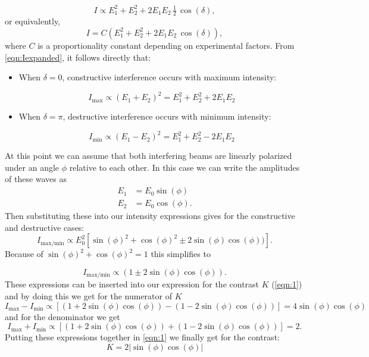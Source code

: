 $$
I \propto E_1^2 + E_2^2 + 2E_1E_2\,\tfrac12\,\cos(\delta),
$$
or equivalently,
\begin{equation}
I = C(E_1^2+E_2^2+ 2E_1E_2\,\cos({\delta})),
    \label{eqn:Iexpanded}
\end{equation}
where $C$ is a proportionality constant depending on experimental factors.
\noindent
From \autoref{eqn:Iexpanded}, it follows directly that:
\begin{itemize}
\item When $\delta = 0$, constructive interference occurs with maximum intensity:
  
$$
I_\text{max}\propto (E_1+E_2)^2 = E_1^2+E_2^2+ 2E_1E_2
$$

\item When $\delta = \pi$, destructive interference occurs with minimum intensity:
  
$$
I_\text{min}\propto (E_1-E_2)^2 = E_1^2+E_2^2 - 2E_1E_2
$$
\end{itemize}
\noindent
At this point we can assume that both interfering beams are linearly polarized under an angle $\phi$ relative to each other. In this case we can write the amplitudes of these waves as
\begin{align*}
    E_1&=E_0 \sin(\phi) \\
    E_2&=E_0 \cos(\phi).
\end{align*}
Then substituting these into our intensity expressions gives for the constructive and destructive cases:
\begin{equation}
    I_\text{max/min}\propto E_0^2 [\sin(\phi)^2 + \cos(\phi)^2 \pm 2\sin(\phi)\cos(\phi))].
\end{equation}
Because of $\sin(\phi)^2 + \cos(\phi)^2 =1$ this simplifies to

\begin{equation*}
    I_\text{max/min}\propto (1\pm 2\sin(\phi)\cos(\phi)).
\end{equation*}
These expressions can be inserted into our expression for the contrast $K$ (\autoref{eqn:1}) and by doing this we get for the numerator of $K$
\begin{equation*}
 I_\text{max} - I_\text{min} \propto [(1+2 \sin(\phi) \cos(\phi))-(1-2 \sin(\phi) \cos(\phi))] =4 \sin(\phi)\cos(\phi)
\end{equation*}
and for the denominator we get
\begin{equation*}
 I_\text{max} + I_\text{min} \propto [(1+2 \sin(\phi) \cos(\phi))+(1-2 \sin(\phi) \cos(\phi))] =2.
\end{equation*}
\noindent
Putting these expressions together in \autoref{eqn:1} we finally get for the contrast:
\begin{equation}
    K=2|\sin(\phi)\cos(\phi)|
    \label{eqn:k2}
\end{equation}

